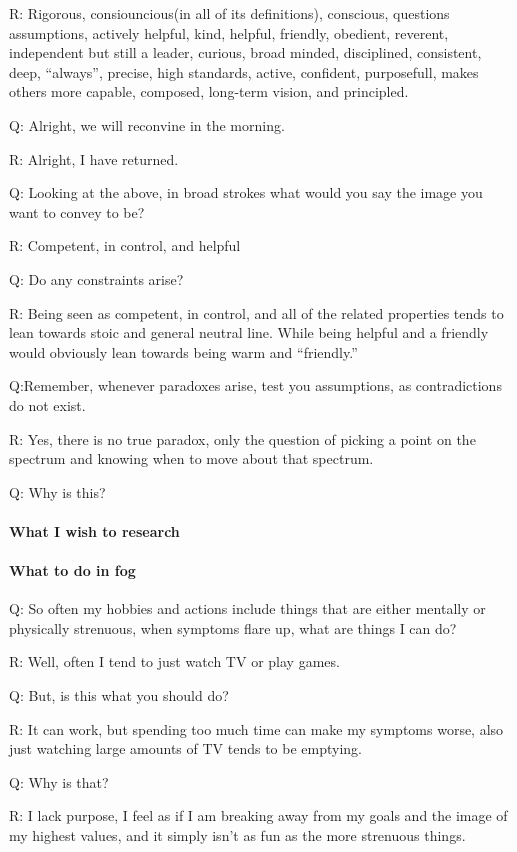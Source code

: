 R: Rigorous, consiouncious(in all of its definitions), conscious, questions assumptions, actively helpful, kind, helpful, friendly, obedient, reverent, independent but still a leader, curious, broad minded, disciplined, consistent, deep, ``always'', precise, high standards, active, confident, purposefull, makes others more capable, composed, long-term vision, and principled.

Q: Alright, we will reconvine in the morning.

R: Alright, I have returned.

Q: Looking at the above, in broad strokes what would you say the image you want to convey to be?

R: Competent, in control, and helpful

Q: Do any constraints arise?

R: Being seen as competent, in control, and all of the related properties tends to lean towards stoic and general neutral line. While being helpful and a friendly would obviously lean towards being warm and ``friendly.''

Q:Remember, whenever paradoxes arise, test you assumptions, as contradictions do not exist.

R: Yes, there is no true paradox, only the question of picking a point on the spectrum and knowing when to move about that spectrum.

Q: Why is this?
\paragraph{What I wish to research}


\paragraph{What to do in fog}
Q: So often my hobbies and actions include things that are either mentally or physically strenuous, when symptoms flare up, what are things I can do?

R: Well, often I tend to just watch TV or play games.

Q: But, is this what you should do?

R: It can work, but spending too much time can make my symptoms worse, also just watching large amounts of TV tends to be emptying.

Q: Why is that?

R: I lack purpose, I feel as if I am breaking away from my goals and the image of my highest values, and it simply isn't as fun as the more strenuous things.

